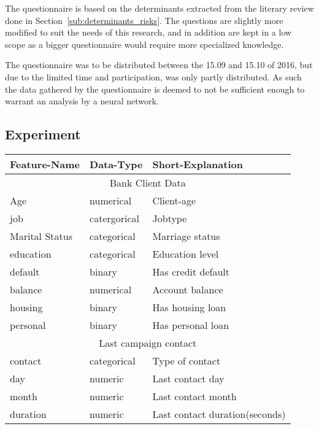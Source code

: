 \documentclass[12pt]{article}
\begin{document}
The questionnaire is based on the determinants extracted from the literary review done in Section~\ref{sub:determinants_risks}. The questions are slightly more modified to suit the needs of this research, and in addition are kept in a low scope as a bigger questionnaire would require more specialized knowledge.

The questionnaire was to be distributed between the 15.09 and 15.10 of 2016, but due to the limited time and participation, was only partly distributed. As such the data gathered by the questionnaire is deemed to not be sufficient enough to warrant an analysis by a neural network.

\subsection{Experiment}
\begin{sidewaystable}\label{tab:set_description}
    \begin{minipage}{.5\linewidth}
        \centering
        \begin{tabularx}{\textwidth}{@{}XXX@{}}
            \toprule
            Feature-Name & Data-Type & Short-Explanation \\
            \midrule
            \multicolumn{3}{c}{Bank Client Data} \\
            \midrule
            Age & numerical & Client-age \\
            job & catergorical & Jobtype \\
            Marital Status & categorical & Marriage status \\
            education & categorical & Education level\\
            default & binary & Has credit default\\
            balance & numerical & Account balance\\
            housing & binary & Has housing loan\\
            personal & binary & Has personal loan\\
            \midrule
            \multicolumn{3}{c}{Last campaign contact} \\
            \midrule
            contact & categorical & Type of contact\\
            day & numeric & Last contact day\\
            month & numeric & Last contact month\\
            duration & numeric & Last contact duration(seconds) \\

\end{tabularx}
\end{minipage}
\end{sidewaystable}
\end{document}
